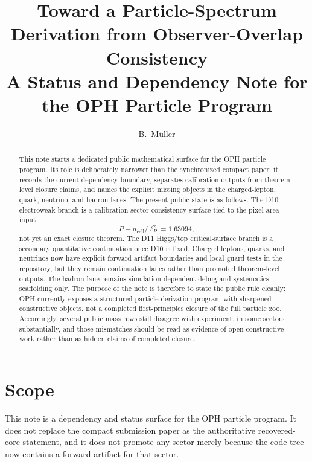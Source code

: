 \documentclass[11pt]{article}
\title{Toward a Particle-Spectrum Derivation from Observer-Overlap Consistency\\[0.4em]
\large A Status and Dependency Note for the OPH Particle Program}
\author{B.\ M\"uller}
\date{\OPHPaperReleaseDate}
\begin{document}
\maketitle
\OPHPaperReleaseBanner

\begin{abstract}
This note starts a dedicated public mathematical surface for the OPH particle
program. Its role is deliberately narrower than the synchronized compact paper:
it records the current dependency boundary, separates calibration outputs from
theorem-level closure claims, and names the explicit missing objects in the
charged-lepton, quark, neutrino, and hadron lanes. The present public state is
as follows. The D10 electroweak branch is a calibration-sector consistency
surface tied to the pixel-area input
\[
P \equiv a_{\mathrm{cell}}/\ell_P^2 = 1.63094,
\]
not yet an exact closure theorem. The D11 Higgs/top critical-surface branch is
a secondary quantitative continuation once D10 is fixed. Charged leptons,
quarks, and neutrinos now have explicit forward artifact boundaries and local
guard tests in the repository, but they remain continuation lanes rather than
promoted theorem-level outputs. The hadron lane remains simulation-dependent
debug and systematics scaffolding only. The purpose of the note is therefore to
state the public rule cleanly: OPH currently exposes a structured particle
derivation program with sharpened constructive objects, not a completed
first-principles closure of the full particle zoo. Accordingly, several public
mass rows still disagree with experiment, in some sectors substantially, and
those mismatches should be read as evidence of open constructive work rather
than as hidden claims of completed closure.
\end{abstract}

\section{Scope}

This note is a dependency and status surface for the OPH particle program. It
does not replace the compact submission paper as the authoritative recovered-core
statement, and it does not promote any sector merely because the code tree now
contains a forward artifact for that sector.
\end{document}
